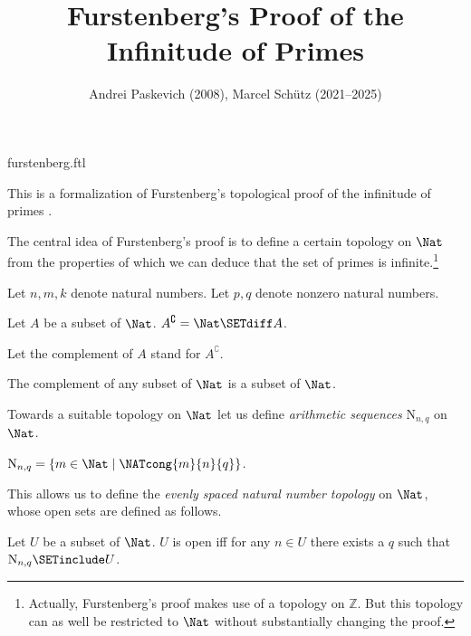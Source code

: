 \documentclass{article}
\title{Furstenberg's Proof of the Infinitude of Primes}
\author{Andrei Paskevich (2008), Marcel Schütz (2021--2025)}
\date{}
\newcommand{\N}{\mathrm{N}}
\newcommand{\Int}{\mathbb{Z}}
\begin{document}
\begin{smodule}{furstenberg.ftl}
\maketitle


\noindent This is a formalization of Furstenberg's topological proof of the
infinitude of primes \cite[p. 353]{Furstenberg1955}.

The central idea of Furstenberg's proof is to define a certain topology on
$\Nat$ from the properties of which we can deduce that the set of
primes is infinite.\footnote{Actually, Furstenberg's proof makes use of a
topology on $\Int$. But this topology can as well be restricted to
$\Nat$ without substantially changing the proof.}

\begin{forthel}
  Let $n, m, k$ denote natural numbers.
  Let $p, q$ denote nonzero natural numbers.

  \begin{definition}
    Let $A$ be a subset of $\Nat$.
    $A^\complement = \Nat \SETdiff A$.
  \end{definition}

  Let the complement of $A$ stand for $A^\complement$.

  \begin{lemma}
    The complement of any subset of $\Nat$ is a subset of $\Nat$.
  \end{lemma}
\end{forthel}

Towards a suitable topology on $\Nat$ let us define \textit{arithmetic
sequences} $\N_{n, q}$ on $\Nat$.

\begin{forthel}
  \begin{definition}
    $\N_{n, q} = \{ m \in \Nat \mid \NATcong{m}{n}{q} \}$.
  \end{definition}
\end{forthel}

This allows us to define the \textit{evenly spaced natural number
topology} on $\Nat$, whose open sets are defined as follows.

\begin{forthel}
  \begin{definition}
    Let $U$ be a subset of $\Nat$.
    $U$ is open iff for any $n \in U$ there exists a $q$ such that
    $\N_{n, q} \SETinclude U$.
  \end{definition}


\end{forthel}
\end{smodule}
\end{document}
